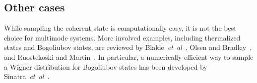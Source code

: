 \subsection{Other cases}

While sampling the coherent state is computationally easy, it is not the best choice for multimode systems.
More involved examples, including thermalized states and Bogoliubov states, are reviewed by Blakie~\textit{et~al}~\cite{Blakie2008}, Olsen and Bradley~\cite{Olsen2009}, and Ruostekoski and Martin~\cite{Ruostekoski2010}.
In particular, a numerically efficient way to sample a Wigner distribution for Bogoliubov states has been developed by Sinatra~\textit{et~al}~\cite{Sinatra2002}.
